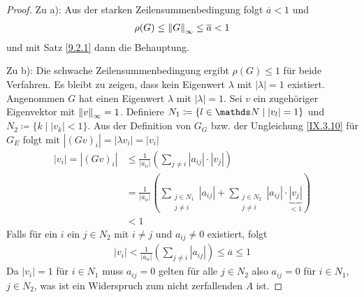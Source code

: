 \begin{Satze}[Zeilensummenkriterium]
\begin{proof}
Zu a): Aus der starken Zeilensummenbedingung folgt $\overline{a}<1$
und
\begin{gather*}
  \rho(G)\leq \nn[G]_\infty \leq \overline{a}<1
\end{gather*}
und mit Satz \ref{9.2.1} dann die Behauptung.

Zu b): Die schwache Zeilensummenbedingung ergibt 
$\rho(G) \leq 1$ für beide Verfahren.
Es bleibt zu zeigen, dass kein Eigenwert $\lambda$ mit
$|\lambda|=1$ existiert.
Angenommen $G$ hat einen Eigenwert $\lambda$ mit $|\lambda|=1$.
Sei $v$ ein zugehöriger Eigenvektor mit $\nn[v]_\infty=1$.
Definiere $N_1\coloneqq \{l\in\N \mid |v_l|=1\}$
und $N_2\coloneqq \{k\mid |v_k| <1\}$.
Aus der Definition von $G_G$ bzw. der Ungleichung \eqref{IX.3.10}
für $G_E$ folgt mit $|(Gv)_i| = |\lambda v_i| = |v_i|$
\begin{align*}
  |v_i| = |(Gv)_i| &\leq \frac{1}{|a_{ii}|}\left(
                     \sum_{j\neq i} |a_{ij}|\cdot |{v_j}|
                     \right) \\
                   &=\frac{1}{|a_{ii}|}\left(
                     \sum_{\substack{j\in N_1\\j\neq i}}|a_{ij}|
                     +\sum_{\substack{j\in N_2\\j\neq i}} |a_{ij}|
                     \cdot\underbrace{|{v_j}|}_{<1}
                     \right) \\
                   &<1
\end{align*}
Falls für ein $i$ ein $j\in N_2$ mit $i\neq j$ und $a_{ij}\neq 0$
existiert, folgt
\begin{gather*}
  |v_i| < \frac{1}{|a_{ii}|} \left( \sum_{j\neq i}|a_{ij}|\right)
  \leq \overline{a} \leq 1
\end{gather*}
Da $|v_i|=1$ für $i\in N_1$ muss $a_{ij}=0$ gelten für alle $j\in N_2$
also $a_{ij}=0$ für $i\in N_1$, $j\in N_2$,
was ist ein Widerspruch zum nicht zerfallenden $A$ ist.
\end{proof}
\end{Satze}




